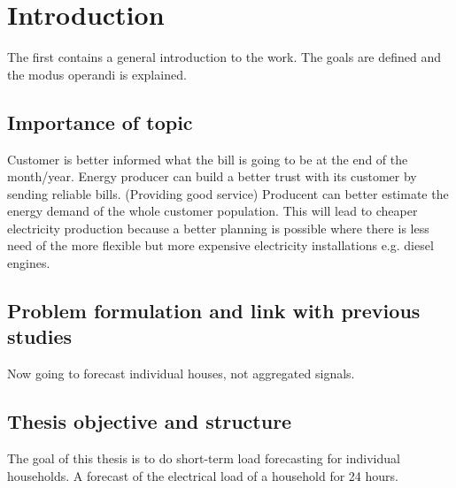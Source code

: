 \chapter{Introduction}
\label{cha:intro}
The first contains a general introduction to the work. The goals are
defined and the modus operandi is explained.

\section{Importance of topic}
Customer is better informed what the bill is going to be at the end of the month/year.
Energy producer can build a better trust with its customer by sending reliable bills. (Providing good service)
Producent can better estimate the energy demand of the whole customer population. This will lead to cheaper electricity production because a better planning is possible where there is less need of the more 
flexible but more expensive electricity installations e.g. diesel engines.

\section{Problem formulation and link with previous studies}
Now going to forecast individual houses, not aggregated signals. 


\section{Thesis objective and structure}
The goal of this thesis is to do short-term load forecasting for individual households. A forecast of the electrical load of a household for 24 hours. 

